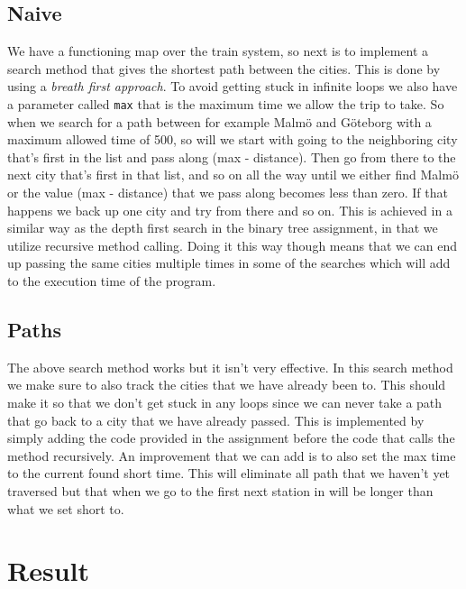 \documentclass[a4paper,11pt]{article}
\begin{document}
\subsection{Naive}
We have a functioning map over the train system, so next is to implement a search method that gives the shortest path between the cities.
This is done by using a \textit{breath first approach}. To avoid getting stuck in infinite loops we also have a parameter called {\tt max}
that is the maximum time we allow the trip to take. So when we search for a path between for example Malmö and Göteborg with a maximum allowed
time of 500, so will we start with going to the neighboring city that's first in the list and pass along (max - distance). Then go from
there to the next city that's first in that list, and so on all the way until we either find Malmö or the value (max - distance) that we
pass along becomes less than zero. If that happens we back up one city and try from there and so on. This is achieved in a similar way as
the depth first search in the binary tree assignment, in that we utilize recursive method calling. Doing it this way though means that we
can end up passing the same cities multiple times in some of the searches which will add to the execution time of the program.

\subsection{Paths}
The above search method works but it isn't very effective. In this search method we make sure to also track the cities that we have already
been to. This should make it so that we don't get stuck in any loops since we can never take a path that go back to a city that we have
already passed. This is implemented by simply adding the code provided in the assignment before the code that calls the method recursively.
An improvement that we can add is to also set the max time to the current found short time. This will eliminate all path that we haven't
yet traversed but that when we go to the first next station in will be longer than what we set short to.

\section{Result}
\end{document}
